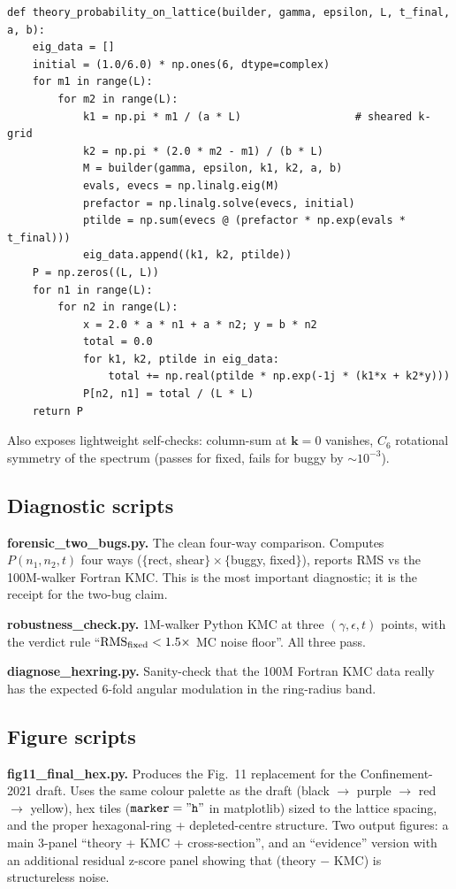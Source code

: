 \documentclass[11pt,a4paper]{article}
\newcommand{\vk}{\mathbf{k}}
\begin{document}
\begin{lstlisting}
def theory_probability_on_lattice(builder, gamma, epsilon, L, t_final, a, b):
    eig_data = []
    initial = (1.0/6.0) * np.ones(6, dtype=complex)
    for m1 in range(L):
        for m2 in range(L):
            k1 = np.pi * m1 / (a * L)                  # sheared k-grid
            k2 = np.pi * (2.0 * m2 - m1) / (b * L)
            M = builder(gamma, epsilon, k1, k2, a, b)
            evals, evecs = np.linalg.eig(M)
            prefactor = np.linalg.solve(evecs, initial)
            ptilde = np.sum(evecs @ (prefactor * np.exp(evals * t_final)))
            eig_data.append((k1, k2, ptilde))
    P = np.zeros((L, L))
    for n1 in range(L):
        for n2 in range(L):
            x = 2.0 * a * n1 + a * n2; y = b * n2
            total = 0.0
            for k1, k2, ptilde in eig_data:
                total += np.real(ptilde * np.exp(-1j * (k1*x + k2*y)))
            P[n2, n1] = total / (L * L)
    return P
\end{lstlisting}

Also exposes lightweight self-checks: column-sum at $\vk=0$ vanishes,
$C_6$ rotational symmetry of the spectrum (passes for fixed, fails for
buggy by $\sim 10^{-3}$).

\subsection{Diagnostic scripts}\label{ssec:diagnostics}

\textbf{{\sf forensic\_two\_bugs.py}.} The clean four-way comparison.
Computes $P(n_1, n_2, t)$ four ways
($\{$rect, shear$\} \times \{$buggy, fixed$\}$), reports RMS vs the
100M-walker Fortran KMC. This is the most important diagnostic; it is
the receipt for the two-bug claim.

\textbf{{\sf robustness\_check.py}.} 1M-walker Python KMC at three
$(\gamma, \epsilon, t)$ points, with the verdict rule
``$\mathrm{RMS}_{\rm fixed} < 1.5 \times $ MC noise floor''. All three pass.

\textbf{{\sf diagnose\_hexring.py}.} Sanity-check that the 100M Fortran
KMC data really has the expected 6-fold angular modulation in the
ring-radius band.

\subsection{Figure scripts}\label{ssec:figs}

\textbf{{\sf fig11\_final\_hex.py}.} Produces the Fig.~11 replacement
for the Confinement-2021 draft. Uses the same colour palette as the
draft (black $\to$ purple $\to$ red $\to$ yellow), hex tiles
($\mathtt{marker="h"}$ in matplotlib) sized to the lattice spacing, and
the proper hexagonal-ring + depleted-centre structure. Two output
figures: a main 3-panel ``theory + KMC + cross-section'', and an
``evidence'' version with an additional residual z-score panel showing
that (theory $-$ KMC) is structureless noise.
\end{document}
